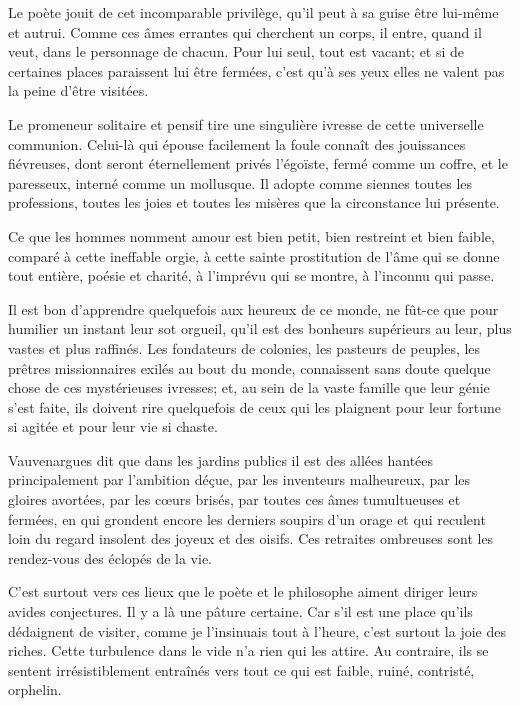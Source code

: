 Le poète jouit de cet incomparable privilège, qu’il
peut à sa guise être lui{}-même et autrui. Comme ces âmes errantes qui
cherchent un corps, il entre, quand il veut, dans le personnage de
chacun. Pour lui seul, tout est vacant; et si de certaines places
paraissent lui être fermées, c’est
qu’à ses yeux elles ne valent pas la peine
d’être visitées.

Le promeneur solitaire et pensif tire une singulière ivresse de cette
universelle communion. Celui{}-là qui épouse facilement la foule
connaît des jouissances fiévreuses, dont seront éternellement privés
l’égoïste, fermé comme un coffre, et le paresseux,
interné comme un mollusque. Il adopte comme siennes toutes les
professions, toutes les joies et toutes les misères que la circonstance
lui présente.

Ce que les hommes nomment amour est bien petit, bien restreint et bien
faible, comparé à cette ineffable orgie, à cette sainte prostitution de
l’âme qui se donne tout entière, poésie et charité, à
l’imprévu qui se montre, à l’inconnu
qui passe.

\quebra
Il est bon d’apprendre quelquefois aux heureux de ce
monde, ne fût{}-ce que pour humilier un instant leur sot orgueil,
qu’il est des bonheurs supérieurs au leur, plus vastes
et plus raffinés. Les fondateurs de colonies, les pasteurs de peuples,
les prêtres missionnaires exilés au bout du monde, connaissent sans
doute quelque chose de ces mystérieuses ivresses; et, au sein de la
vaste famille que leur génie s’est faite, ils doivent
rire quelquefois de ceux qui les plaignent pour leur fortune si agitée
et pour leur vie si chaste.


Vauvenargues dit que dans les jardins publics il est des allées hantées
principalement par l’ambition déçue, par les
inventeurs malheureux, par les gloires avortées, par les c\oe urs brisés,
par toutes ces âmes tumultueuses et fermées, en qui grondent encore les
derniers soupirs d’un orage et qui reculent loin du
regard insolent des joyeux et des oisifs. Ces retraites ombreuses sont
les rendez{}-vous des éclopés de la vie.

C’est surtout vers ces lieux que le poète et le
philosophe aiment diriger leurs avides conjectures. Il y a là une
pâture certaine. Car s’il est une place
qu’ils dédaignent de visiter, comme je
l’insinuais tout à l’heure,
c’est surtout la joie des riches. Cette turbulence
dans le vide n’a rien qui les attire. Au contraire,
ils se sentent irrésistiblement entraînés vers tout ce qui est faible,
ruiné, contristé, orphelin.


